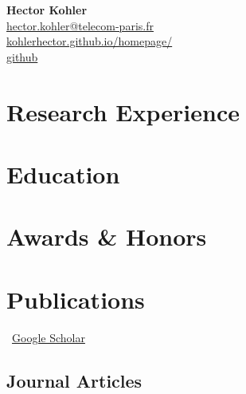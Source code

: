 \documentclass[11pt]{article} %
\newcommand{\mytitle}[4]{
  \begin{center}
    \Large\textbf{#1}\normalsize \\ %
    \href{mailto:#2}{#2} \\ %
    \href{https://#3}{#3} \\ %
    #4 %
  \end{center}
}
\begin{document}
\mytitle{Hector Kohler}{hector.kohler@telecom-paris.fr}{kohlerhector.github.io/homepage/}{\href{https://github.com/KohlerHECTOR/}{github}} %


\RaggedRight



\section*{Research Experience}
\label{exp_research}


\section*{Education}


\section*{Awards \& Honors}
\label{awards}



\section*{Publications}
\label{pubs}

\vspace{-.75em}
\small
\faGoogle~\href{https://scholar.google.com/citations?user=aSO7bZ0AAAAJ&hl=en}{Google Scholar}\\
\normalsize


\subsection*{Journal Articles}
\label{journal-article}
\newrefcontext[labelprefix=J] %
\nocite{*}%
\printbibliography[
    type=article, %
    heading=none, %
    resetnumbers=true, %
    keyword=J %
]
\end{document}
